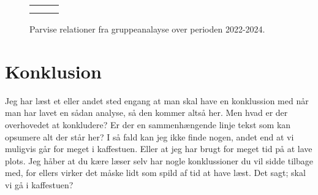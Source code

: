 \documentclass{article}
\newlength\myheight
\newlength\mydepth
\newcommand*\inlinegraphics[1]{%
  \settototalheight\myheight{Xygp}%
  \settodepth\mydepth{Xygp}%
  \raisebox{-\mydepth}{\texttt{[image: \#1]}}%
}
\newcommand{\coffee}[0]{\inlinegraphics{coffee.png}}
\begin{document}
\begin{figure}[h!]
	\centering
	\begin{tabularx}{\linewidth}{MMM}
		\resizebox{.32\textwidth}{!}{}
		&
		\resizebox{.32\textwidth}{!}{}
		&
		\resizebox{.32\textwidth}{!}{}
		\\
		\label{subfig:pair_relation_max_pair}
		&
		\label{subfig:pair_relation_group_count}
		&
		\label{subfig:pair_relation_max_group_count}
	\end{tabularx}
	\vspace{-25pt}
	\caption{Parvise relationer fra gruppeanalayse over perioden 2022-2024.}
	\label{fig:pair_relation}
\end{figure}


\section*{Konklusion}

Jeg har læst et eller andet sted engang at man skal have en konklussion med når man har lavet en sådan analyse, så den kommer altså her.
Men hvad er der overhovedet at konkludere? Er der en sammenhængende linje tekst som kan opsumere alt der står her?
I så fald kan jeg ikke finde nogen, andet end at vi muligvis går for meget i kaffestuen. Eller at jeg har brugt for meget tid på at lave plots.
Jeg håber at du kære læser selv har nogle konklussioner du vil sidde tilbage med, for ellers virker det måske lidt som spild af tid at have læst.
Det sagt; skal vi gå i kaffestuen? \coffee\


\end{document}
